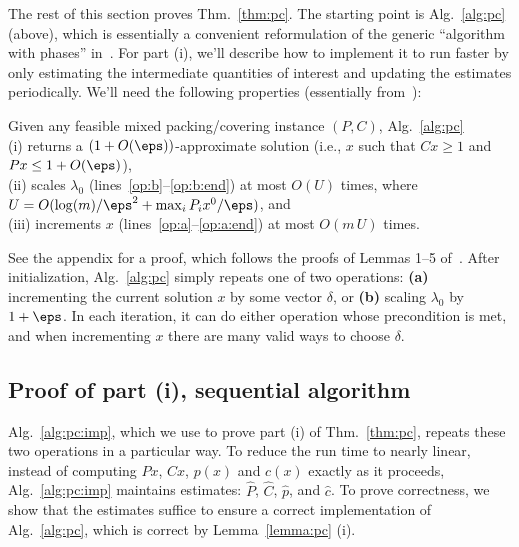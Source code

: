 The rest of this section proves Thm.~\ref{thm:pc}. 
The starting point is Alg.~\ref{alg:pc} (above),
which is essentially a convenient reformulation of the generic ``algorithm with phases''
in~\cite[Fig.~2]{Young01Sequential}.
For part (i), we'll describe how to implement it to run faster
by only estimating the intermediate quantities of interest
and updating the estimates periodically.
We'll need the following properties (essentially from~\cite{Young01Sequential}):

\begin{lemma}\label{lemma:pc} 
  Given any feasible mixed packing/covering instance $(P,C)$, Alg.~\ref{alg:pc}
  \\(i) returns a $(1+O(\eps))$-approximate solution
  (i.e., $x$ such that $Cx \ge 1$ and $Px \le 1+O(\eps)$),
  \\(ii) scales $\lambda_0$ (lines~\ref{op:b}--\ref{op:b:end}) at most $O(U)$ times, 
  where $U = O(\log(m)/\eps^2 + \max_i P_i x^0/\eps)$, and
  \\(iii) increments $x$ (lines~\ref{op:a}--\ref{op:a:end}) at most $O(m\, U)$ times.
\end{lemma}
See the appendix for a proof,
which follows the proofs of Lemmas 1--5 of~\cite{Young01Sequential}. 
After initialization, Alg.~\ref{alg:pc} simply 
repeats one of two operations: {\bf (a)}
incrementing the current solution $x$ by some vector $\delta$,
or {\bf (b)} scaling $\lambda_0$ by $1+\eps$.
In each iteration, it can do either operation whose precondition is met,
and when incrementing $x$ there are many valid ways to choose $\delta$.

\subsection{Proof of part (i), sequential algorithm}
Alg.~\ref{alg:pc:imp}, which we use to prove part (i) of Thm.~\ref{thm:pc},
repeats these two operations in a particular way.
To reduce the run time to nearly linear,
instead of computing $Px$, $Cx$, $p(x)$ and $c(x)$ exactly as it proceeds,
Alg.~\ref{alg:pc:imp} maintains estimates:
$\widehat P$, $\widehat C$, $\widehat p$, and $\widehat c$.
To prove correctness,
we show that the estimates suffice to ensure
a correct implementation of Alg.~\ref{alg:pc},
which is correct by Lemma~\ref{lemma:pc} (i).

